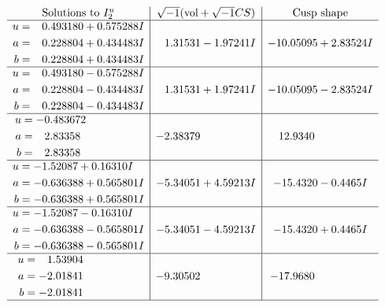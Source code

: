 \documentclass[1p]{elsarticle_modified}
\theoremstyle{definition}
\newcommand{\I}{\sqrt{-1}}
\begin{document}
$$\begin{array}{c|c|c}  
\text{Solutions to }I^u_{2}& \I (\text{vol} + \sqrt{-1}CS) & \text{Cusp shape}\\
 \hline 
\begin{aligned}
u &= \phantom{-}0.493180 + 0.575288 I \\
a &= \phantom{-}0.228804 + 0.434483 I \\
b &= \phantom{-}0.228804 + 0.434483 I\end{aligned}
 & \phantom{-}1.31531 - 1.97241 I & -10.05095 + 2.83524 I \\ \hline\begin{aligned}
u &= \phantom{-}0.493180 - 0.575288 I \\
a &= \phantom{-}0.228804 - 0.434483 I \\
b &= \phantom{-}0.228804 - 0.434483 I\end{aligned}
 & \phantom{-}1.31531 + 1.97241 I & -10.05095 - 2.83524 I \\ \hline\begin{aligned}
u &= -0.483672\phantom{ +0.000000I} \\
a &= \phantom{-}2.83358\phantom{ +0.000000I} \\
b &= \phantom{-}2.83358\phantom{ +0.000000I}\end{aligned}
 & -2.38379\phantom{ +0.000000I} & \phantom{-}12.9340\phantom{ +0.000000I} \\ \hline\begin{aligned}
u &= -1.52087 + 0.16310 I \\
a &= -0.636388 + 0.565801 I \\
b &= -0.636388 + 0.565801 I\end{aligned}
 & -5.34051 + 4.59213 I & -15.4320 - 0.4465 I \\ \hline\begin{aligned}
u &= -1.52087 - 0.16310 I \\
a &= -0.636388 - 0.565801 I \\
b &= -0.636388 - 0.565801 I\end{aligned}
 & -5.34051 - 4.59213 I & -15.4320 + 0.4465 I \\ \hline\begin{aligned}
u &= \phantom{-}1.53904\phantom{ +0.000000I} \\
a &= -2.01841\phantom{ +0.000000I} \\
b &= -2.01841\phantom{ +0.000000I}\end{aligned}
 & -9.30502\phantom{ +0.000000I} & -17.9680\phantom{ +0.000000I}\\
 \hline 
 \end{array}$$\newpage\newpage\renewcommand{\arraystretch}{1}
\end{document}
